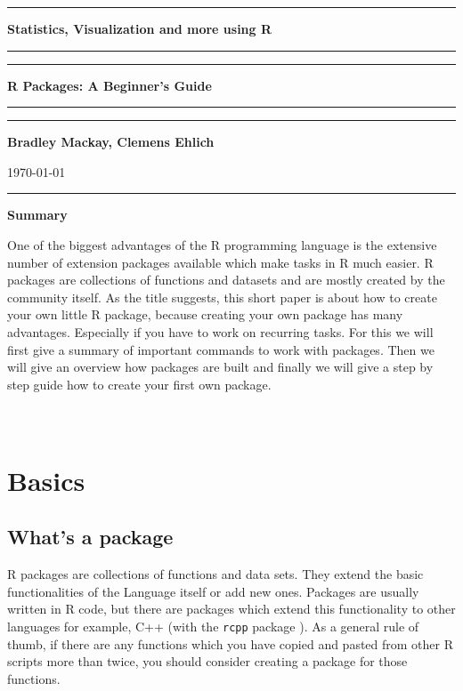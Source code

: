 \documentclass[a4paper,11pt]{article}
\begin{document}
\hrule
\begin{center}
\Large{\textbf{Statistics, Visualization and more using R}} \\[3mm]
\hrule
\hrule 
\vspace{2mm}
\LARGE{\textbf{R Packages: A Beginner's Guide }} \\[2mm] 
\hrule
\hrule
\vspace{6mm}
\large{ \textbf{Bradley Mackay, Clemens Ehlich}	
}\\[5mm]

\end{center}
\begin{center}
\today
\end{center}
\hrule
\vspace{3cm}


\begin{center}
\large{\textbf{Summary}}
\end{center}
One of the biggest advantages of the R programming language is the extensive number of extension packages available which make tasks in R  much easier. R packages are collections of functions and datasets and are mostly created by the community itself. As the title suggests, this short paper is about how to create your own little R package, because creating your own package has many advantages. Especially if you have to work on recurring tasks. For this we will first give a summary of important commands to work with packages. Then we will give an overview how packages are built and finally we will give a step by step guide how to create your first own package.
\\
\\
\\
\pagebreak
\tableofcontents
\vspace*{2cm}
\nopagebreak
\section{Basics}
\subsection{What's a package}

R packages are collections of functions and data sets. They extend the basic functionalities of the Language itself or add new ones. Packages are usually written in R code, but there are packages which extend this functionality to other languages for example, C++ (with the \texttt{rcpp} package \cite{Rcpp} ). As a general rule of thumb, if there are any functions which you have copied and pasted from other R scripts more than twice, you should consider creating a package for those functions.
\end{document}
